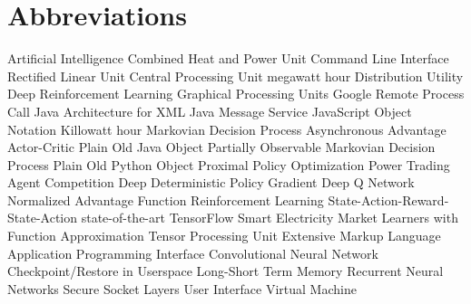 \newpage
\section*{Abbreviations}
\begin        {acronym}[PowerTAC]
	       {Artificial Intelligence}
	      {Combined Heat and Power Unit}
	      {Command Line Interface}
         {Rectified Linear Unit}
	      {Central Processing Unit}
          {megawatt hour}
	       {Distribution Utility}
	   {Deep Reinforcement Learning}
	      {Graphical Processing Units}
	     {Google Remote Process Call}
	     {Java Architecture for XML}
	      {Java Message Service}
	     {JavaScript Object Notation}
          {Killowatt hour}
	      {Markovian Decision Process}
          {Asynchronous Advantage Actor-Critic}
	     {Plain Old Java Object}
	    {Partially Observable Markovian Decision Process}
	     {Plain Old Python Object}
	      {Proximal Policy Optimization}
	 {Power Trading Agent Competition}
         {Deep Deterministic Policy Gradient}
          {Deep Q Network}
          {Normalized Advantage Function}
	       {Reinforcement Learning}
	    {State-Action-Reward-State-Action}
	     {state-of-the-art}
	       {TensorFlow}
         {Smart Electricity Market Learners with Function Approximation}
	      {Tensor Processing Unit}
	      {Extensive Markup Language}
          {Application Programming Interface}
          {Convolutional Neural Network}
         {Checkpoint/Restore in Userspace}
         {Long-Short Term Memory}
          {Recurrent Neural Networks}
           {Secure Socket Layers}
           {User Interface}
           {Virtual Machine}

\end          {acronym}
